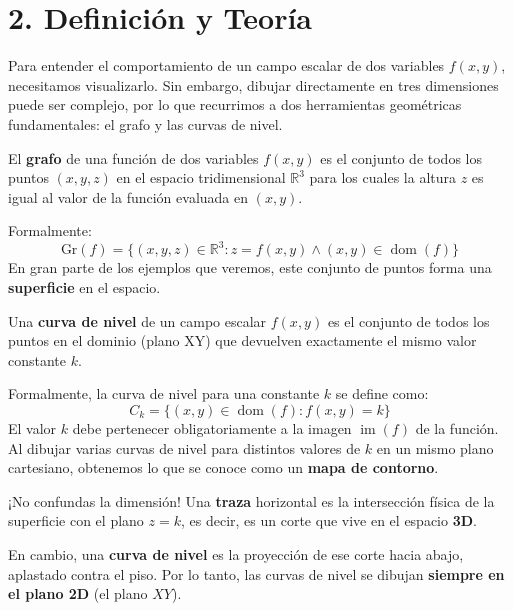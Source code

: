 \documentclass[11pt]{article}
\newenvironment{teoria}{%
  \section*{2. Definición y Teoría}%
}{}
\newenvironment{definicion}[1]{%
  \begin{tcolorbox}[colback=blue!5,colframe=blue!75!black,title=Definición: #1]%
}{%
  \end{tcolorbox}%
}
\newenvironment{alerta}[1]{%
  \begin{tcolorbox}[colback=yellow!10,colframe=orange!80!black,title=Alerta: #1]%
}{%
  \end{tcolorbox}%
}
\begin{document}
\begin{teoria}
  Para entender el comportamiento de un campo escalar de dos variables $f(x,y)$, necesitamos visualizarlo. Sin embargo, dibujar directamente en tres dimensiones puede ser complejo, por lo que recurrimos a dos herramientas geométricas fundamentales: el grafo y las curvas de nivel.

  \begin{definicion}{Grafo de un Campo Escalar (Superficie)}
    El \textbf{grafo} de una función de dos variables $f(x,y)$ es el conjunto de todos los puntos $(x,y,z)$ en el espacio tridimensional $\mathbb{R}^3$ para los cuales la altura $z$ es igual al valor de la función evaluada en $(x,y)$.
    
    Formalmente:
    $$ \text{Gr}(f) = \{ (x,y,z) \in \mathbb{R}^3 \colon z = f(x,y) \wedge (x,y) \in \operatorname{dom}(f) \} $$
    En gran parte de los ejemplos que veremos, este conjunto de puntos forma una \textbf{superficie} en el espacio.
  \end{definicion}

  \begin{definicion}{Curvas de Nivel}
    Una \textbf{curva de nivel} de un campo escalar $f(x,y)$ es el conjunto de todos los puntos en el dominio (plano XY) que devuelven exactamente el mismo valor constante $k$.
    
    Formalmente, la curva de nivel para una constante $k$ se define como:
    $$ C_k = \{ (x,y) \in \operatorname{dom}(f) \colon f(x,y) = k \} $$
    El valor $k$ debe pertenecer obligatoriamente a la imagen $\operatorname{im}(f)$ de la función. Al dibujar varias curvas de nivel para distintos valores de $k$ en un mismo plano cartesiano, obtenemos lo que se conoce como un \textbf{mapa de contorno}.
  \end{definicion}

  \begin{alerta}{Curva de Nivel vs. Traza}
    ¡No confundas la dimensión! Una \textbf{traza} horizontal es la intersección física de la superficie con el plano $z = k$, es decir, es un corte que vive en el espacio \textbf{3D}. 
    
    En cambio, una \textbf{curva de nivel} es la proyección de ese corte hacia abajo, aplastado contra el piso. Por lo tanto, las curvas de nivel se dibujan \textbf{siempre en el plano 2D} (el plano $XY$).
  \end{alerta}


\end{teoria}
\end{document}
